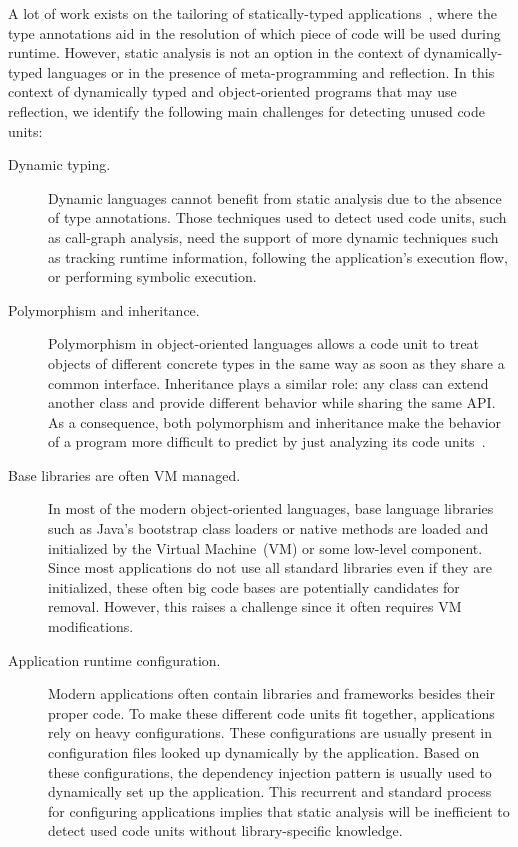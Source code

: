 A lot of work exists on the tailoring of statically-typed applications~\cite{ShortCour10a,ShortRays02a,ShortTip03a,ShortPopa04a,ShortTeod01a}, where the type annotations aid in the resolution of which piece of code will be used during runtime. 
However, static analysis is not an option in the context of dynamically-typed languages or in the presence of meta-programming and reflection.
In this context of dynamically typed and object-oriented programs that may use reflection, we identify the following main challenges for detecting unused code units:

\begin{description}

\item[Dynamic typing.] Dynamic languages cannot benefit from static analysis due to the absence of type annotations. Those techniques used to detect used code units, such as call-graph analysis, need the support of more dynamic techniques such as tracking runtime information, following the application's execution flow, or performing symbolic execution.

\item[Polymorphism and inheritance.] Polymorphism in object-oriented languages allows a code unit to treat objects of different concrete types in the same way as soon as they share a common interface. Inheritance plays a similar role: any class can extend another class and provide different behavior while sharing the same API.
As a consequence, both polymorphism and inheritance make the behavior of a program more difficult to predict by just analyzing its code units~\cite{ShortTaen89a}.

\item[Base libraries are often VM managed.] In most of the modern object-oriented languages, base language libraries such as Java's bootstrap class loaders or native methods are loaded and initialized by the Virtual Machine~(VM) or some low-level component. Since most applications do not use all standard libraries even if they are initialized, these often big code bases are potentially candidates for removal. However, this raises a challenge since it often requires VM modifications.

\item[Application runtime configuration.] Modern applications often contain libraries and frameworks besides their proper code. 
To make these different code units fit together, applications rely on heavy configurations. 
These configurations are usually present in configuration files looked up dynamically by the application. 
Based on these configurations, the dependency injection pattern is usually used to dynamically set up the application. 
This recurrent and standard process for configuring applications implies that static analysis will be inefficient to detect used code units without library-specific knowledge.


\end{description}
